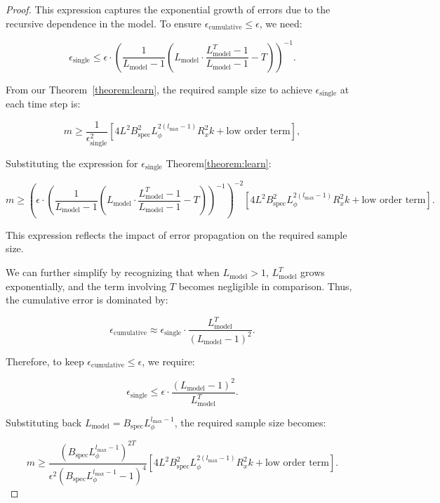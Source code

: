 \begin{proof}
This expression captures the exponential growth of errors due to the recursive dependence in the model.
To ensure \( \epsilon_{\text{cumulative}} \leq \epsilon \), we need:

\[
\epsilon_{\text{single}} \leq \epsilon \cdot \left( \frac{1}{L_{\text{model}} - 1} \left( L_{\text{model}} \cdot \frac{L_{\text{model}}^{T} - 1}{L_{\text{model}} - 1} - T \right) \right)^{-1}.
\]


From our Theorem~\ref{theorem:learn}, the required sample size to achieve \( \epsilon_{\text{single}} \) at each time step is:

\[
m \geq \frac{1}{\epsilon_{\text{single}}^2}\left[ 4 L^2 B_{\text{spec}}^2 L_{\phi}^{2(l_{\text{max}}-1)} R_x^2 k + \text{low order term} \right],
\]

Substituting the expression for \( \epsilon_{\text{single}} \) Theorem\ref{theorem:learn}:

\[
m \geq \left( \epsilon \cdot \left( \frac{1}{L_{\text{model}} - 1} \left( L_{\text{model}} \cdot \frac{L_{\text{model}}^{T} - 1}{L_{\text{model}} - 1} - T \right) \right)^{-1} \right)^{-2} \left[ 4 L^2 B_{\text{spec}}^2 L_{\phi}^{2(l_{\text{max}}-1)} R_x^2 k + \text{low order term} \right].
\]

This expression reflects the impact of error propagation on the required sample size.

We can further simplify by recognizing that when \( L_{\text{model}} > 1 \), \( L_{\text{model}}^{T} \) grows exponentially, and the term involving \( T \) becomes negligible in comparison. Thus, the cumulative error is dominated by:

\[
\epsilon_{\text{cumulative}} \approx \epsilon_{\text{single}} \cdot \frac{L_{\text{model}}^{T}}{(L_{\text{model}} - 1)^2}.
\]

Therefore, to keep \( \epsilon_{\text{cumulative}} \leq \epsilon \), we require:

\[
\epsilon_{\text{single}} \leq \epsilon \cdot \frac{(L_{\text{model}} - 1)^2}{L_{\text{model}}^{T}}.
\]




Substituting back \(  L_{\text{model}} = B_{\text{spec}} L_{\phi}^{l_{\text{max}}-1} \), the required sample size becomes:

\[
m \geq \frac{\left( B_{\text{spec}} L_{\phi}^{l_{\text{max}}-1} \right)^{2T}}{\epsilon^{2} \left( B_{\text{spec}} L_{\phi}^{l_{\text{max}}-1} - 1 \right)^{4}} \left[ 4 L^2 B_{\text{spec}}^2 L_{\phi}^{2(l_{\text{max}}-1)} R_x^2 k + \text{low order term} \right].
\]

\end{proof}

